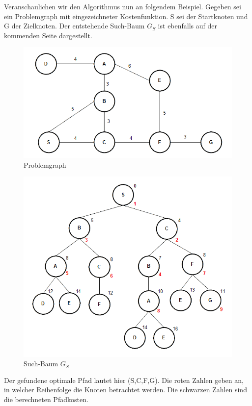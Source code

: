 Veranschaulichen wir den Algorithmus nun an folgendem Beispiel. Gegeben sei ein Problemgraph mit eingezeichneter Kostenfunktion. S sei der Startknoten und G der Zielknoten. Der entstehende Such-Baum $G_{S}$ ist ebenfalls auf der kommenden Seite dargestellt.

\begin{figure}[h!]
	\includegraphics[scale=0.6]{chapters/informed_search/bab.png}
	\caption{Problemgraph}
	\label{fig:figure3}
\end{figure}

\begin{figure}[h!]
	\includegraphics[scale=0.6]{chapters/informed_search/babsearch.png}
	\caption{Such-Baum $G_{S}$}
	\label{fig:figure4}
\end{figure}

Der gefundene optimale Pfad lautet hier (S,C,F,G).
Die roten Zahlen geben an, in welcher Reihenfolge die Knoten betrachtet werden. Die schwarzen Zahlen sind die berechneten Pfadkosten.

